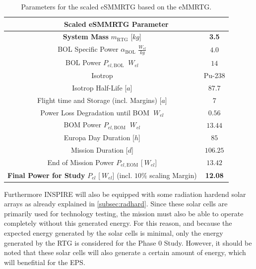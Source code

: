\begin{table}[H]
\centering
\begin{tabular}{|c|c|}
\hline
\multicolumn{2}{|c|}{Scaled eSMMRTG Parameter}                \\ \hline
\textbf{System Mass} $m_\text{RTG}$ [$kg$]                             & \textbf{3.5}     \\ \hline
BOL Specific Power $\alpha_\text{BOL}$ $\frac{W_{el}}{kg}$  & $4.0$     \\ \hline
BOL Power $P_{el,\text{BOL}}$ $\ W_{el}$                    & $14$       \\ \hline
Isotrop                                                     & Pu-238   \\ \hline
Isotrop Half-Life [$a$]                                       & $87.7$     \\ \hline
Flight time and Storage (incl. Margins) [$a$]                 & $7$        \\ \hline
Power Loss Degradation until BOM $\ W_{el}$                 & $0.56$     \\ \hline
BOM Power $P_{el,\text{BOM}}$ $\ W_{el}$                    & $13.44$    \\ \hline
Europa Day Duration [$h$]                                     & $85$       \\ \hline
Mission Duration [$d$]                                        & $106.25$   \\ \hline
End of Mission Power $P_{el,\text{EOM}}$ [$\ W_{el}$]         & $13.42$   \\ \hline
\textbf{Final Power for Study} $P_{el}$ [$\ W_{el}$] (incl. $10\%$ scaling Margin) & \textbf{12.08}    \\ \hline

\end{tabular}
\caption{Parameters for the scaled eSMMRTG based on the eMMRTG.}
\label{tab:esmmrtg}
\end{table}

Furthermore INSPIRE will also be equipped with some radiation hardend solar arrays as already explained in \autoref{subsec:radhard}. Since these solar cells are primarily used for technology testing, the mission must also be able to operate completely without this generated energy. For this reason, and because the expected energy generated by the solar cells is minimal, only the energy generated by the RTG is considered for the Phase 0 Study. However, it should be noted that these solar cells will also generate a certain amount of energy, which will benefitial for the EPS.


